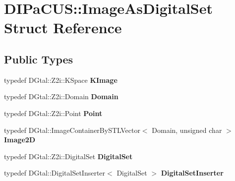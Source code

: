 \hypertarget{structDIPaCUS_1_1ImageAsDigitalSet}{}\section{D\+I\+Pa\+C\+US\+:\+:Image\+As\+Digital\+Set Struct Reference}
\label{structDIPaCUS_1_1ImageAsDigitalSet}
\subsection*{Public Types}
\begin{DoxyCompactItemize}
\item 
\mbox{\label{structDIPaCUS_1_1ImageAsDigitalSet_ab0542ed1cf95b831878e8c4c8e0530a6}} 
typedef D\+Gtal\+::\+Z2i\+::\+K\+Space {\bfseries K\+Image}
\item 
\mbox{\label{structDIPaCUS_1_1ImageAsDigitalSet_a60edee9fe25df7db6bc3374f359a8b81}} 
typedef D\+Gtal\+::\+Z2i\+::\+Domain {\bfseries Domain}
\item 
\mbox{\label{structDIPaCUS_1_1ImageAsDigitalSet_a8f5b7dd1a3337a9d7eb34f4dcb8622c2}} 
typedef D\+Gtal\+::\+Z2i\+::\+Point {\bfseries Point}
\item 
\mbox{\label{structDIPaCUS_1_1ImageAsDigitalSet_a2754cb729113229d40ca76b523e80d30}} 
typedef D\+Gtal\+::\+Image\+Container\+By\+S\+T\+L\+Vector$<$ Domain, unsigned char $>$ {\bfseries Image2D}
\item 
\mbox{\label{structDIPaCUS_1_1ImageAsDigitalSet_a48f1b9c3886b9d940550fe786eaab206}} 
typedef D\+Gtal\+::\+Z2i\+::\+Digital\+Set {\bfseries Digital\+Set}
\item 
\mbox{\label{structDIPaCUS_1_1ImageAsDigitalSet_adb3219af6be5ff8ea40fe516740951a4}} 
typedef D\+Gtal\+::\+Digital\+Set\+Inserter$<$ Digital\+Set $>$ {\bfseries Digital\+Set\+Inserter}
\end{DoxyCompactItemize}
